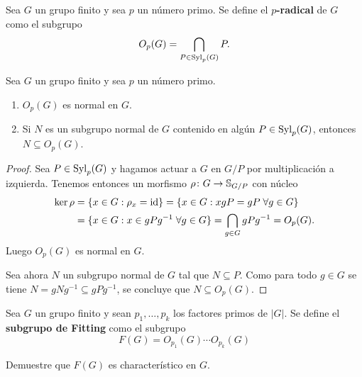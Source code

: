 \begin{definition}
	Sea $G$ un grupo finito y sea $p$ un número primo. Se define el
	\textbf{$p$-radical} de $G$ como el subgrupo
	\[
		O_p(G)=\bigcap_{P\in\mathrm{Syl}_p(G)}P.
	\]
\end{definition}

\begin{lemma}
	\label{lemma:core:Op(G)}
	Sea $G$ un grupo finito y sea $p$ un número primo. 
	\begin{enumerate}
		\item $O_p(G)$ es normal en $G$.
		\item Si $N$ es un subgrupo normal de $G$ contenido en algún
			$P\in\mathrm{Syl}_p(G)$, entonces $N\subseteq O_p(G)$.
	\end{enumerate}
\end{lemma}

\begin{proof}
	Sea $P\in\mathrm{Syl}_p(G)$ y hagamos actuar a $G$ en $G/P$ por multiplicación a
	izquierda. Tenemos entonces un morfismo $\rho\colon G\to\mathbb{S}_{G/P}$ con
	núcleo
	\begin{align*}
		\ker\rho&=\{x\in G:\rho_x=\operatorname{id}\}
		=\{x\in G:xgP=gP\;\forall g\in G\}\\
		&=\{x\in G:x\in gPg^{-1}\;\forall g\in G\}=\bigcap_{g\in G}gPg^{-1}=O_p(G).
	\end{align*}
	Luego $O_p(G)$ es normal en $G$.

	Sea ahora $N$ un subgrupo normal de $G$ tal que $N\subseteq P$. Como para
	todo $g\in G$ se tiene $N=gNg^{-1}\subseteq gPg^{-1}$, se concluye que
	$N\subseteq O_p(G)$.
\end{proof}

\begin{definition}
	Sea $G$ un grupo finito y sean $p_1,\dots,p_k$ los factores primos de
	$|G|$.  Se define el \textbf{subgrupo de Fitting} como el subgrupo
	\[
		F(G)=O_{p_1}(G)\cdots O_{p_k}(G)
	\]
\end{definition}

\begin{exercise}
	Demuestre que $F(G)$ es characterístico en $G$.
\end{exercise}



